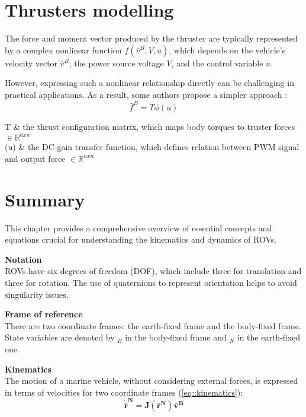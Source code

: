 \section{Thrusters modelling}

    The force and moment vector produced by the thruster are typically represented 
    by a complex nonlinear function $f(\bar{v}^B, V, u)$, which depends on the 
    vehicle's velocity vector $\bar{v}^B$, the power source voltage $V$, and the 
    control variable $u$.

    However, expressing such a nonlinear relationship directly can be challenging 
    in practical applications. 
    As a result, some authors propose a simpler approach \cite{actuators}:
    \begin{equation}
        \bar{f}^B=T\phi(u)
        \label{eq::thrust_model}
    \end{equation}
    \begin{conditions}
        \text{\quad} T & the thrust configuration matrix, which maps body torques to truster 
        forces $\in \mathbb{R}^{6 x n}$ \\
        \phi(u) & the DC-gain transfer function, which defines relation between
        PWM signal and output force $\in \mathbb{R}^{n x n}$
    \end{conditions}

\section{Summary}

This chapter provides a comprehensive overview of essential 
concepts and equations crucial for understanding the kinematics and dynamics of ROVs.

\textbf{Notation} \\
ROVs have six degrees of freedom (DOF), which include three for translation and three for rotation.
The use of quaternions to represent orientation helps to avoid singularity issues.

\textbf{Frame of reference} \\
There are two coordinate frames: the earth-fixed frame and the body-fixed frame. 
State variables are denoted by $_B$ in the body-fixed frame and $_N$ in the earth-fixed one.

\textbf{Kinematics} \\
The motion of a marine vehicle, without considering external forces, 
is expressed in terms of velocities for two coordinate frames (\ref{eq::kinematics}):
$$
\mathbf{\dot{\bar{r}}^N=J(\bar{r}^N) \bar{v}^B}
$$

